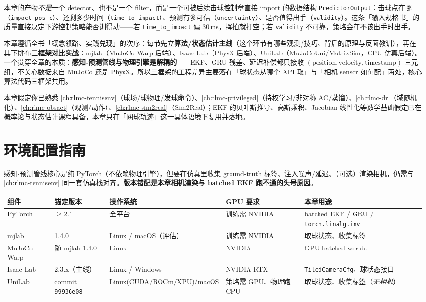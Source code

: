 本章的产物\emph{不是}一个 detector、也不是一个 filter，而是一个可被后续击球控制章直接 import 的数据结构 \verb|PredictorOutput|：击球点在哪（\verb|impact_pos_c|）、还剩多少时间（\verb|time_to_impact|）、预测有多可信（\verb|uncertainty|）、是否值得出手（\verb|validity|）。这条「输入规格书」的质量直接决定下游控制策略能否训得动——若 \verb|time_to_impact| 偏 $30$\,ms，挥拍就打空；若 \verb|validity| 不可靠，策略会在不该出手时出手。

本章遵循全书「概念领路、实践兑现」的次序：每节先立\textbf{算法/状态估计主线}（这个环节有哪些观测/技巧、背后的原理与反面教训），再在其下排布\textbf{三框架对比实战}：mjlab（MuJoCo Warp 后端）、Isaac Lab（PhysX 后端）、UniLab（MuJoCoUni/MotrixSim，CPU 仿真后端）。一个贯穿全章的本质：\textbf{感知-预测管线与物理引擎是解耦的}——EKF、GRU 残差、延迟补偿都只接收 $(\text{position},\text{velocity},\text{timestamp})$ 三元组，不关心数据来自 MuJoCo 还是 PhysX。所以三框架的工程差异主要落在「球状态从哪个 API 取」与「相机 sensor 如何配」两处，核心算法代码三框架共用。

本章假定你已熟悉 \cref{ch:rlmc-tennisenv}（球场/球物理/发球命令）、\cref{ch:rlmc-privileged}（特权学习/非对称 AC/蒸馏）、\cref{ch:rlmc-dr}（域随机化）、\cref{ch:rlmc-obsact}（观测/动作）、\cref{ch:rlmc-sim2real}（Sim2Real）；EKF 的贝叶斯推导、高斯乘积、Jacobian 线性化等数学基础假定已在概率论与状态估计课程具备，本章只在「网球轨迹」这一具体语境下复用并落地。

\section*{环境配置指南}
\label{sec:rlmc-perc-env}

感知-预测管线核心是纯 PyTorch（不依赖物理引擎），但要在仿真里收集 ground-truth 标签、注入噪声/延迟、（可选）渲染相机，仍需与 \cref{ch:rlmc-tennisenv} 同一套仿真栈对齐。\textbf{版本错配是本章相机渲染与 batched EKF 跑不通的头号原因}。

\begin{center}
\small
\begin{tabular}{@{}lllll@{}}
\toprule
组件 & 锚定版本 & 操作系统 & GPU 要求 & 本章用途 \\
\midrule
PyTorch & $\ge 2.1$ & 全平台 & 训练需 NVIDIA & batched EKF / GRU / \verb|torch.linalg.inv| \\
mjlab & 1.4.0 & Linux / macOS（评估） & 训练需 NVIDIA & 取球状态、收集标签 \\
MuJoCo Warp & 随 mjlab 1.4.0 & Linux & NVIDIA & GPU batched worlds \\
Isaac Lab & 2.3.x（主线） & Linux / Windows & NVIDIA RTX & \verb|TiledCameraCfg|、球状态接口 \\
UniLab & commit \texttt{99936e08} & Linux(CUDA/ROCm/XPU)/macOS & 策略需 GPU、物理跑 CPU & 取球状态、收集标签（\emph{无相机}） \\
\bottomrule
\end{tabular}
\end{center}

